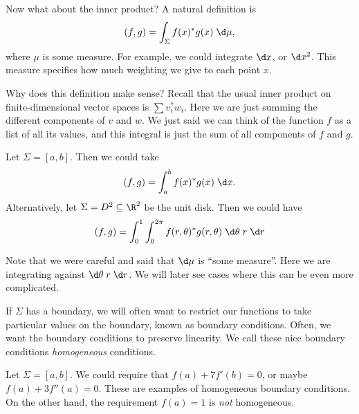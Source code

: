 \documentclass[a4paper]{article}
\begin{document}
Now what about the inner product? A natural definition is
\[
  (f, g) = \int_{\Sigma} f(x)^* g(x) \;\d \mu,
\]
where $\mu$ is some measure. For example, we could integrate $\d x$, or $\d x^2$. This measure specifies how much weighting we give to each point $x$.

Why does this definition make sense? Recall that the usual inner product on finite-dimensional vector spaces is $\sum v_i^* w_i$. Here we are just summing the different components of $v$ and $w$. We just said we can think of the function $f$ as a list of all its values, and this integral is just the sum of all components of $f$ and $g$.

\begin{eg}
  Let $\Sigma = [a, b]$. Then we could take
  \[
    (f, g) = \int_a^b f(x)^* g(x)\;\d x.
  \]
  Alternatively, let $\Sigma = D^2 \subseteq \R^2$ be the unit disk. Then we could have
  \[
    (f, g) = \int_0^1 \int_0^{2\pi}f(r, \theta)^* g(r, \theta)\;\d \theta\; r\;\d r
  \]
\end{eg}
Note that we were careful and said that $\d \mu$ is ``some measure''. Here we are integrating against $\d\theta\;r\;\d r$. We will later see cases where this can be even more complicated.

If $\Sigma$ has a boundary, we will often want to restrict our functions to take particular values on the boundary, known as boundary conditions. Often, we want the boundary conditions to preserve linearity. We call these nice boundary conditions \emph{homogeneous} conditions.

\begin{eg}
  Let $\Sigma = [a, b]$. We could require that $f(a) + 7 f'(b) = 0$, or maybe $f(a) + 3 f''(a) = 0$. These are examples of homogeneous boundary conditions. On the other hand, the requirement $f(a) = 1$ is \emph{not} homogeneous.
\end{eg}
\end{document}
